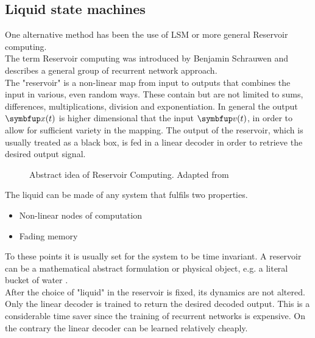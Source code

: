 \subsection{Liquid state machines}
One alternative method has been the use of \ac{LSM} or more general Reservoir computing.\\
The term Reservoir computing was introduced by Benjamin Schrauwen and describes a general group of recurrent network approach\cite{verstraeten_experimental_2007}.\\
The "reservoir" is a non-linear map from input to outputs that combines the input in various, even random ways. These contain but are not limited to sums, differences, multiplications, division and exponentiation. In general the output $\bmu{x}(t)$ is higher dimensional that the input $\bmu{v}(t)$, in order to allow for sufficient variety in the mapping. The output of the reservoir, which is usually treated as a black box, is fed in a linear decoder in order to retrieve the desired output signal.\\
\begin{figure}
	\centering
	
	\caption{Abstract idea of Reservoir Computing. Adapted from \cite{cooper_liquid_2011}}
	\label{fig:reservoir_computing}
\end{figure}
The liquid can be made of any system that fulfils two properties.\\
\begin{itemize}
	\item Non-linear nodes of computation
	\item Fading memory
\end{itemize}
To these points it is usually set for the system to be time invariant\cite{cooper_liquid_2011}.
A reservoir can be a mathematical abstract formulation or physical object, e.g. a literal bucket of water \cite{tanaka_recent_2019}.\\
After the choice of "liquid" in the reservoir is fixed, its dynamics are not altered. Only the linear decoder is trained to return the desired decoded output. This is a considerable time saver since the training of recurrent networks is expensive. On the contrary the linear decoder can be learned relatively cheaply.\\
